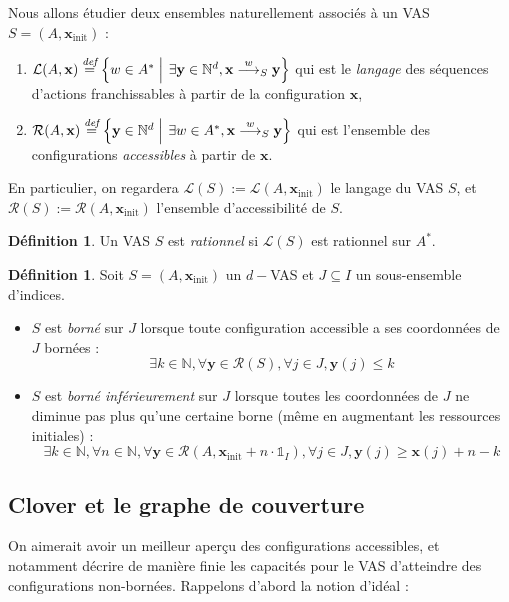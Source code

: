 \documentclass[a4paper,final]{article}
\theoremstyle{definition}
\newtheorem{Definition}[Theorem]{Définition}
\let\leq\leqslant
\let\geq\geqslant
\newcommand{\set}[2]{\left\{#1\mathrel{\left|\vphantom{#1}\vphantom{#2}\right.}#2\right\}}
\newcommand{\defeq}{\ensuremath{\stackrel{\textit{def}}{=}}}
\newcommand{\N}{\ensuremath{\mathbb{N}}}
\newcommand{\indicatrice}[1]{\ensuremath{\mathds{1}_{#1}}}
\newcommand{\lang}{\ensuremath{\mathcal{L}}}
\newcommand{\reach}{\ensuremath{\mathcal{R}}}
\newcommand{\trans}[2]{\ensuremath{\stackrel{#1}{\longrightarrow}_{#2}}}
\newcommand{\vect}[1]{\ensuremath{\mathbf{#1}}}
\newcommand{\xinit}{\ensuremath{\vect{x}_\text{init}}}
\begin{document}
Nous allons étudier deux ensembles naturellement associés à un VAS $S=(A,\xinit)$ :
\begin{enumerate}
    \item 
    $\lang(A,\vect{x})\defeq \set{w\in A^\ast} {\exists \vect{y}\in\N^d, \vect{x}\trans{w}{S}\vect{y}}$ qui est le \emph{langage} des séquences d'actions franchissables à partir de la configuration $\vect{x}$,
    
    \item $\reach(A,\vect{x})\defeq \set{\vect{y}\in\N^d} {\exists w\in A^\ast, \vect{x}\trans{w}{S} \vect{y}}$ qui est l'ensemble des configurations \emph{accessibles} à partir de $\vect{x}$. 
\end{enumerate}

En particulier, on regardera $\lang(S):=\lang(A,\xinit)$ le langage du VAS $S$, et $\reach(S):=\reach(A,\xinit)$ l'ensemble d'accessibilité de $S$.

\begin{Definition}
Un VAS $S$ est \emph{rationnel} si $\lang(S)$ est rationnel sur $A^\ast$.
\end{Definition}

\begin{Definition}
Soit $S = (A,\xinit)$ un $d-$VAS et $J\subseteq I$ un sous-ensemble d'indices.
\begin{itemize}
    \item $S$ est \emph{borné} sur $J$ lorsque toute configuration accessible a ses coordonnées de $J$ bornées :
    $$\exists k\in\N, \forall \vect{y}\in\reach(S), \forall j\in J, \vect{y}(j)\leq k$$
    
    \item $S$ est \emph{borné inférieurement} sur $J$ lorsque toutes les coordonnées de $J$ ne diminue pas plus qu'une certaine borne (même en augmentant les ressources initiales) :
    $$\exists k\in\N, \forall n\in\N, \forall \vect{y}\in\reach(A,\xinit + n\cdot\indicatrice{I}), \forall j\in J, \vect{y}(j)\geq \vect{x}(j)+n-k$$
\end{itemize}
\end{Definition}

\subsection{Clover et le graphe de couverture}

On aimerait avoir un meilleur aperçu des configurations accessibles, et notamment décrire de manière finie les capacités pour le VAS d'atteindre des configurations non-bornées.
Rappelons d'abord la notion d'idéal :
\end{document}
